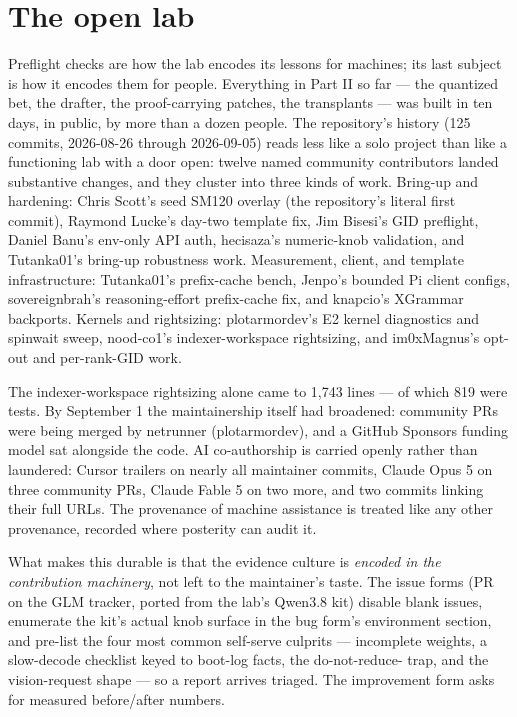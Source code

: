 \section{The open lab}

Preflight checks are how the lab encodes its lessons for machines; its last
subject is how it encodes them for people. Everything in Part II so far --- the quantized bet, the drafter, the
proof-carrying patches, the transplants --- was built in ten days, in
public, by more than a dozen people. The repository's history (125 commits,
2026-08-26 through 2026-09-05) reads less like a solo project than like a
functioning lab with a door open: twelve named community contributors
landed substantive changes, and they cluster into three kinds of work.
Bring-up and hardening: Chris Scott's seed SM120 overlay (the repository's
literal first commit), Raymond Lucke's day-two template fix, Jim Bisesi's
GID preflight, Daniel Banu's env-only API auth, hecisaza's numeric-knob
validation, and Tutanka01's bring-up robustness work. Measurement, client,
and template infrastructure: Tutanka01's prefix-cache bench, Jenpo's
bounded Pi client configs, sovereignbrah's reasoning-effort prefix-cache
fix, and knapcio's XGrammar backports. Kernels and rightsizing:
plotarmordev's E2 kernel diagnostics and spinwait sweep, nood-co1's
indexer-workspace rightsizing, and im0xMagnus's 
opt-out and per-rank-GID work.

The indexer-workspace rightsizing alone came to 1{,}743
lines --- of which 819 were tests. By September 1 the maintainership itself had
broadened: community PRs were being merged by netrunner (plotarmordev), and
a GitHub Sponsors funding model sat alongside the code. AI co-authorship is
carried openly rather than laundered: Cursor trailers on nearly all
maintainer commits, Claude Opus 5 on three community PRs, Claude Fable 5 on
two more, and two commits linking their full  URLs.
The provenance of machine assistance is treated like any other provenance,
recorded where posterity can audit it.

What makes this durable is that the evidence culture is \emph{encoded in
the contribution machinery}, not left to the maintainer's taste. The issue
forms (PR  on the GLM tracker, ported from the lab's Qwen3.8
kit) disable blank issues, enumerate the kit's actual knob surface in the
bug form's environment section, and pre-list the four most common
self-serve culprits --- incomplete weights, a slow-decode checklist keyed
to boot-log facts, the do-not-reduce- trap, and the
vision-request shape --- so a report arrives triaged. The improvement form
asks for measured before/after numbers.

